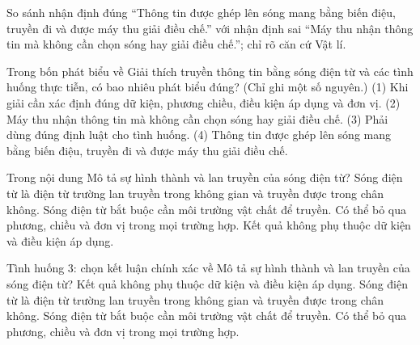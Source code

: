 \begin{bt}
So sánh nhận định đúng “Thông tin được ghép lên sóng mang bằng biến điệu, truyền đi và được máy thu giải điều chế.” với nhận định sai “Máy thu nhận thông tin mà không cần chọn sóng hay giải điều chế.”; chỉ rõ căn cứ Vật lí.
\end{bt}

\begin{ex}
Trong bốn phát biểu về Giải thích truyền thông tin bằng sóng điện từ và các tình huống thực tiễn, có bao nhiêu phát biểu đúng? (Chỉ ghi một số nguyên.) (1) Khi giải cần xác định đúng dữ kiện, phương chiều, điều kiện áp dụng và đơn vị. (2) Máy thu nhận thông tin mà không cần chọn sóng hay giải điều chế. (3) Phải dùng đúng định luật cho tình huống. (4) Thông tin được ghép lên sóng mang bằng biến điệu, truyền đi và được máy thu giải điều chế.
\end{ex}

\begin{ex}
Trong nội dung Mô tả sự hình thành và lan truyền của sóng điện từ?
\choice
{\True Sóng điện từ là điện từ trường lan truyền trong không gian và truyền được trong chân không.}
{Sóng điện từ bắt buộc cần môi trường vật chất để truyền.}
{Có thể bỏ qua phương, chiều và đơn vị trong mọi trường hợp.}
{Kết quả không phụ thuộc dữ kiện và điều kiện áp dụng.}
\end{ex}

\begin{ex}
Tình huống 3: chọn kết luận chính xác về Mô tả sự hình thành và lan truyền của sóng điện từ?
\choice
{Kết quả không phụ thuộc dữ kiện và điều kiện áp dụng.}
{\True Sóng điện từ là điện từ trường lan truyền trong không gian và truyền được trong chân không.}
{Sóng điện từ bắt buộc cần môi trường vật chất để truyền.}
{Có thể bỏ qua phương, chiều và đơn vị trong mọi trường hợp.}
\end{ex}

